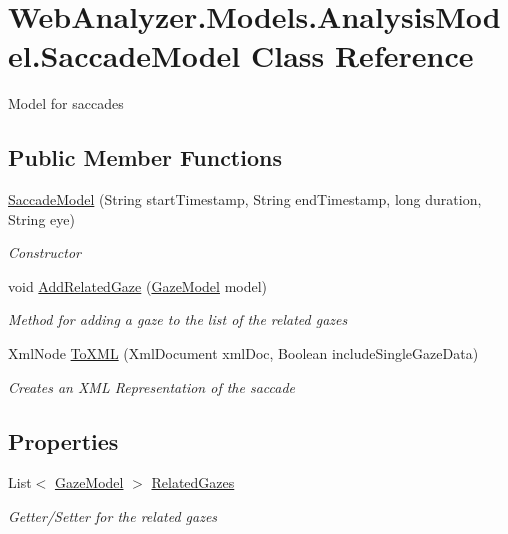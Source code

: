 \hypertarget{class_web_analyzer_1_1_models_1_1_analysis_model_1_1_saccade_model}{}\section{Web\+Analyzer.\+Models.\+Analysis\+Model.\+Saccade\+Model Class Reference}
\label{class_web_analyzer_1_1_models_1_1_analysis_model_1_1_saccade_model}


Model for saccades  


\subsection*{Public Member Functions}
\begin{DoxyCompactItemize}
\item 
\hyperlink{class_web_analyzer_1_1_models_1_1_analysis_model_1_1_saccade_model_a79d89d10a20d49d98c7d93151bc913c7}{Saccade\+Model} (String start\+Timestamp, String end\+Timestamp, long duration, String eye)
\begin{DoxyCompactList}\small\item\em Constructor \end{DoxyCompactList}\item 
void \hyperlink{class_web_analyzer_1_1_models_1_1_analysis_model_1_1_saccade_model_a4167bccd0254507dd6664ed4a4691c82}{Add\+Related\+Gaze} (\hyperlink{class_web_analyzer_1_1_models_1_1_data_model_1_1_gaze_model}{Gaze\+Model} model)
\begin{DoxyCompactList}\small\item\em Method for adding a gaze to the list of the related gazes \end{DoxyCompactList}\item 
Xml\+Node \hyperlink{class_web_analyzer_1_1_models_1_1_analysis_model_1_1_saccade_model_a631bef5fc5b9234cd8e81cc92bcbc276}{To\+X\+M\+L} (Xml\+Document xml\+Doc, Boolean include\+Single\+Gaze\+Data)
\begin{DoxyCompactList}\small\item\em Creates an X\+M\+L Representation of the saccade \end{DoxyCompactList}\end{DoxyCompactItemize}
\subsection*{Properties}
\begin{DoxyCompactItemize}
\item 
List$<$ \hyperlink{class_web_analyzer_1_1_models_1_1_data_model_1_1_gaze_model}{Gaze\+Model} $>$ \hyperlink{class_web_analyzer_1_1_models_1_1_analysis_model_1_1_saccade_model_a32d8fa96fd180fbbfee83b47fd8e72f9}{Related\+Gazes}
\begin{DoxyCompactList}\small\item\em Getter/\+Setter for the related gazes \end{DoxyCompactList}\end{DoxyCompactItemize}
